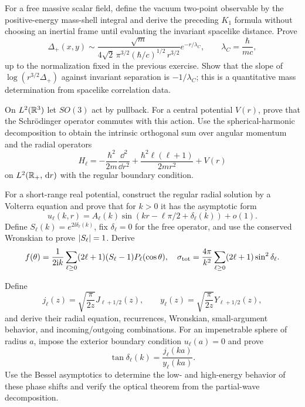 \begin{exercise}
For a free massive scalar field, define the vacuum two-point observable by
the positive-energy mass-shell integral and derive the preceding $K_1$
formula without choosing an inertial frame until evaluating the invariant
spacelike distance.  Prove
\[
 \Delta_+(x,y)\sim
 \frac{\sqrt m}{4\sqrt2\,\pi^{3/2}
 (\hbar/c)^{1/2}\,r^{3/2}}e^{-r/\lambda_C},
 \qquad \lambda_C=\frac\hbar{mc},
\]
up to the normalization fixed in the previous exercise.  Show that the slope
of $\log(r^{3/2}\Delta_+)$ against invariant separation is $-1/\lambda_C$;
this is a quantitative mass determination from spacelike correlation data.
\end{exercise}

\begin{exercise}
On $L^2(\mathbb R^3)$ let $SO(3)$ act by pullback.  For a central potential $V(r)$,
prove that the Schr\"odinger operator commutes with this action.  Use the
spherical-harmonic decomposition to obtain
the intrinsic orthogonal sum over angular momentum and the radial operators
\[
 H_\ell=-\frac{\hbar^2}{2m}\frac{\dd^2}{\dd r^2}
 +\frac{\hbar^2\ell(\ell+1)}{2mr^2}+V(r)
\]
on $L^2(\mathbb R_+,\,\mathrm d r)$ with the regular boundary condition.
\end{exercise}

\begin{exercise}
For a short-range real potential, construct the regular radial solution by a
Volterra equation and prove that for $k>0$ it has the asymptotic form
\[
 u_\ell(k,r)=A_\ell(k)
 \sin(kr-\ell\pi/2+\delta_\ell(k))+o(1).
\]
Define $S_\ell(k)=e^{2\ii\delta_\ell(k)}$, fix
$\delta_\ell=0$ for the free operator, and use the conserved Wronskian to
prove $\left\lvert S_\ell\right\rvert=1$.  Derive
\[
 f(\theta)=\frac1{2\mathrm i k}\sum_{\ell\ge0}(2\ell+1)
 (S_\ell-1)P_\ell(\cos\theta),
 \quad \sigma_{\rm tot}=\frac{4\pi}{k^2}
 \sum_{\ell\ge0}(2\ell+1)\sin^2\delta_\ell.
\]
\end{exercise}

\begin{exercise}
Define
\[
 j_\ell(z)=\sqrt{\frac{\pi}{2z}}J_{\ell+1/2}(z),
 \qquad
 y_\ell(z)=\sqrt{\frac{\pi}{2z}}Y_{\ell+1/2}(z),
\]
and derive their radial equation, recurrences, Wronskian, small-argument
behavior, and incoming/outgoing combinations.  For an impenetrable sphere of
radius $a$, impose the exterior boundary condition $u_\ell(a)=0$ and prove
\[
 \tan\delta_\ell(k)=\frac{j_\ell(ka)}{y_\ell(ka)}.
\]
Use the Bessel asymptotics to determine the low- and high-energy behavior of
these phase shifts and verify the optical theorem from the partial-wave
decomposition.
\end{exercise}

